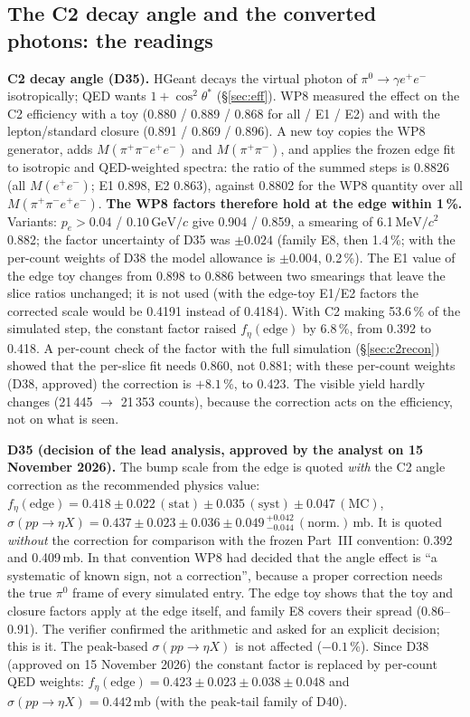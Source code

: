 \documentclass[11pt,a4paper]{article}
\newcommand{\piz}{\ensuremath{\pi^{0}}\xspace}
\newcommand{\ee}{\ensuremath{e^{+}e^{-}}\xspace}
\newcommand{\Mfour}{\ensuremath{M(\pi^{+}\pi^{-}e^{+}e^{-})}\xspace}
\newcommand{\Mee}{\ensuremath{M(e^{+}e^{-})}\xspace}
\newcommand{\Mpipi}{\ensuremath{M(\pi^{+}\pi^{-})}\xspace}
\newcommand{\GeVc}{\ensuremath{\mathrm{GeV}/c}\xspace}
\newcommand{\MeVcc}{\ensuremath{\mathrm{MeV}/c^{2}}\xspace}
\newcommand{\sigeta}{\ensuremath{\sigma(pp\to\eta X)}\xspace}
\newcommand{\notebox}[1]{\par\noindent\colorbox{orange!10}{\parbox{\dimexpr\linewidth-2\fboxsep\relax}{#1}}\par}
\begin{document}
\subsection{The C2 decay angle and the converted photons: the readings}
\label{sec:bedge-c2}
\textbf{C2 decay angle (D35).} HGeant decays the virtual photon of $\piz\to\gamma\ee$ isotropically; QED wants $1+\cos^2\theta^*$ (\S\ref{sec:eff}).
WP8 measured the effect on the C2 efficiency with a toy (0.880 / 0.889 / 0.868 for all / E1 / E2) and with the lepton/standard closure (0.891 / 0.869
/ 0.896). A new toy copies the WP8 generator, adds \Mfour and \Mpipi, and applies the frozen edge fit to isotropic and QED-weighted spectra: the
ratio of the summed steps is 0.8826 (all \Mee; E1 0.898, E2 0.863), against 0.8802 for the WP8 quantity over all \Mfour. \textbf{The WP8 factors
therefore hold at the edge within 1\,\%.} Variants: $p_e>0.04$ / $0.10$\,\GeVc give 0.904 / 0.859, a smearing of 6.1\,\MeVcc 0.882; the factor
uncertainty of D35 was $\pm0.024$ (family E8, then 1.4\,\%; with the per-count weights of D38 the model allowance is $\pm0.004$, 0.2\,\%). The E1 value of the edge toy changes from 0.898 to 0.886 between two smearings that leave the slice
ratios unchanged; it is not used (with the edge-toy E1/E2 factors the corrected scale would be 0.4191 instead of 0.4184). With C2 making
53.6\,\% of the simulated step, the constant factor raised $f_\eta(\mathrm{edge})$ by 6.8\,\%, from 0.392 to 0.418. A per-count check of the factor
with the full simulation (\S\ref{sec:c2recon}) showed that the per-slice fit needs 0.860, not 0.881; with these per-count weights (D38, approved)
the correction is $+8.1$\,\%, to 0.423. The visible yield hardly changes (21\,445 $\to$ 21\,353 counts), because the correction acts on the
efficiency, not on what is seen.

\notebox{\textbf{D35 (decision of the lead analysis, approved by the analyst on 15 November 2026).} The bump scale from the edge is quoted \emph{with} the C2
angle correction as the recommended physics value: $f_\eta(\mathrm{edge})=0.418\pm0.022\,(\mathrm{stat})\pm0.035\,(\mathrm{syst})\pm0.047\,(\mathrm{MC})$,
$\sigeta=0.437\pm0.023\pm0.036\pm0.049\,^{+0.042}_{-0.044}\,(\mathrm{norm.})$\,mb. It is quoted \emph{without} the correction for comparison with
the frozen Part~III convention: 0.392 and 0.409\,mb. In that convention WP8 had decided that the angle effect is ``a systematic of known sign,
not a correction'', because a proper correction needs the true \piz frame of every simulated entry. The edge toy shows that the toy and closure factors
apply at the edge itself, and family E8 covers their spread (0.86--0.91). The verifier confirmed the arithmetic and asked for an explicit decision; this
is it. The peak-based \sigeta is not affected ($-0.1$\,\%). Since D38 (approved on 15 November 2026) the constant factor is replaced by
per-count QED weights: $f_\eta(\mathrm{edge})=0.423\pm0.023\pm0.038\pm0.048$ and $\sigeta=0.442$\,mb (with the peak-tail family of D40).}
\end{document}
